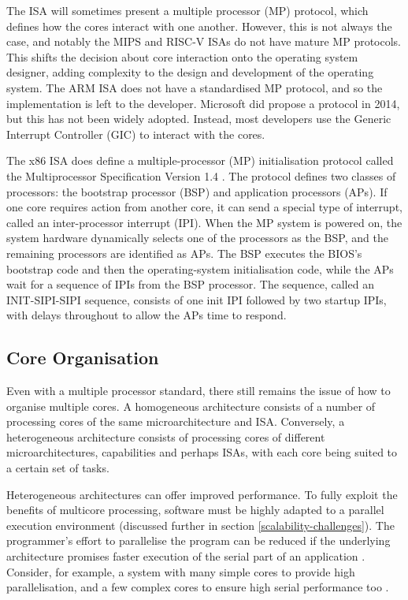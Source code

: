 \documentclass[bsc,frontabs,singlespacing,parskip,deptreport]{infthesis}     %
\begin{document}
The ISA will sometimes present a multiple processor (MP) protocol, which defines how the cores interact with one another. However, this is not always the case, and notably the MIPS and RISC-V ISAs do not have mature MP protocols. This shifts the decision about core interaction onto the operating system designer, adding complexity to the design and development of the operating system. The ARM ISA does not have a standardised MP protocol, and so the implementation is left to the developer. Microsoft did propose a protocol in 2014, but this has not been widely adopted. Instead, most developers use the Generic Interrupt Controller (GIC) to interact with the cores.

The x86 ISA does define a multiple-processor (MP) initialisation protocol called the Multiprocessor Specification Version 1.4 \cite{intel-sys-prog-guide}. The protocol defines two classes of processors: the bootstrap processor (BSP) and application processors (APs). If one core requires action from another core, it can send a special type of interrupt, called an inter-processor interrupt (IPI). When the MP system is powered on, the system hardware dynamically selects one of the processors as the BSP, and the remaining processors are identified as APs. The BSP executes the BIOS’s bootstrap code and then the operating-system initialisation code, while the APs wait for a sequence of IPIs from the BSP processor. The sequence, called an INIT-SIPI-SIPI sequence, consists of one init IPI followed by two startup IPIs, with delays throughout to allow the APs time to respond.

\subsection{Core Organisation}
Even with a multiple processor standard, there still remains the issue of how to organise multiple cores. A homogeneous architecture consists of a number of processing cores of the same microarchitecture and ISA. Conversely, a heterogeneous architecture consists of processing cores of different microarchitectures, capabilities and perhaps ISAs, with each core being suited to a certain set of tasks.

Heterogeneous architectures can offer improved performance. To fully exploit the benefits of multicore processing, software must be highly adapted to a parallel execution environment (discussed further in section \ref{scalability-challenges}). The programmer's effort to parallelise the program can be reduced if the underlying architecture promises faster execution of the serial part of an application \cite{suleman_2007}. Consider, for example, a system with many simple cores to provide high parallelisation, and a few complex cores to ensure high serial performance too \cite{balakrishnan_2005}. 
\end{document}
